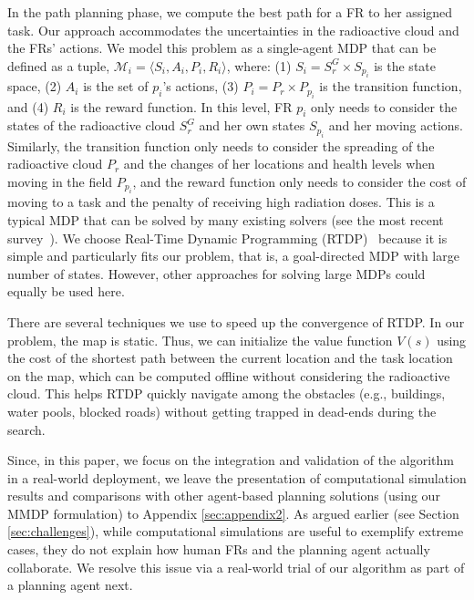 \noindent In the path planning phase, we compute the best path for a
FR to her assigned task.  Our approach accommodates the
uncertainties in the radioactive cloud and the FRs' actions. We
model this problem as a single-agent MDP that can be defined as a
tuple, $\mathcal{M}_i = \langle S_i, A_i, P_i, R_i \rangle$, where:
(1) $S_i = S^G_r \times S_{p_i}$ is the state space, (2) $A_i$ is the
set of $p_i$'s actions, (3) $P_i = P_r \times P_{p_i}$ is the
transition function, and (4) $R_i$ is the reward function. In this
level, FR $p_i$ only needs to consider the states of the
radioactive cloud $S^G_r$ and her own states $S_{p_i}$ and her moving
actions. Similarly, the transition function only needs to consider the
spreading of the radioactive cloud $P_r$ and the changes of her
locations and health levels when moving in the field $P_{p_i}$, and
the reward function only needs to consider the cost of moving to a
task and the penalty of receiving high radiation doses. This is a
typical MDP that can be solved by many existing solvers (see the most
recent survey~\cite{kolobov2012planning}). We choose Real-Time Dynamic
Programming (RTDP)~\cite{barto1995learning} because it is simple and
particularly fits our problem, that is, a goal-directed MDP with large
number of states. However, other approaches for solving large MDPs
could equally be used here.

There are several techniques we use to speed up the convergence of
RTDP. In our problem, the map is static. Thus, we can initialize
the value function $V(s)$ using the cost of the shortest path
between the current location and the task location on the map, which
can be computed offline without considering the radioactive cloud.
This helps RTDP quickly navigate among the obstacles (e.g.,
buildings, water pools, blocked roads) without getting trapped in
dead-ends during the search. 

Since, in this paper, we focus on the integration and validation of
the algorithm in a real-world deployment, we leave the presentation of
computational simulation results and comparisons with other
agent-based planning solutions (using our MMDP formulation) to
Appendix \ref{sec:appendix2}. As argued earlier (see Section
\ref{sec:challenges}), while computational simulations are useful to
exemplify extreme cases, they do not explain how human FRs and the
planning agent actually collaborate. We resolve this issue via a
real-world trial of our algorithm as part of a planning agent next.


